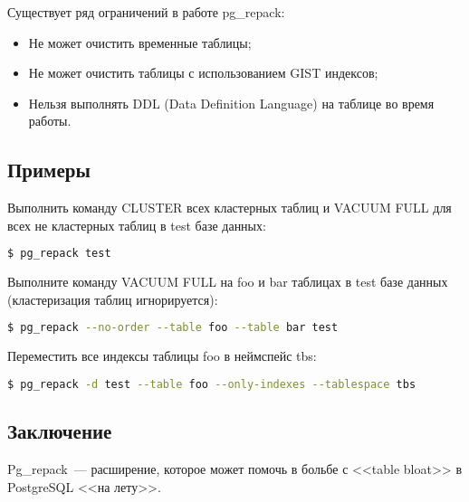 Существует ряд ограничений в работе pg\_repack:

\begin{itemize}
  \item Не может очистить временные таблицы;
  \item Не может очистить таблицы с использованием GIST индексов;
  \item Нельзя выполнять DDL (Data Definition Language) на таблице во время работы.
\end{itemize}

\subsection{Примеры}

Выполнить команду CLUSTER всех кластерных таблиц и VACUUM FULL для всех не кластерных таблиц в test базе данных:

\begin{lstlisting}[language=Bash,label=lst:pgrepack1]
$ pg_repack test
\end{lstlisting}

Выполните команду VACUUM FULL на foo и bar таблицах в test базе данных (кластеризация таблиц игнорируется):

\begin{lstlisting}[language=Bash,label=lst:pgrepack2]
$ pg_repack --no-order --table foo --table bar test
\end{lstlisting}

Переместить все индексы таблицы foo в неймспейс tbs:

\begin{lstlisting}[language=Bash,label=lst:pgrepack3]
$ pg_repack -d test --table foo --only-indexes --tablespace tbs
\end{lstlisting}

\subsection{Заключение}

Pg\_repack~--- расширение, которое может помочь в больбе с <<table bloat>> в PostgreSQL <<на лету>>.
